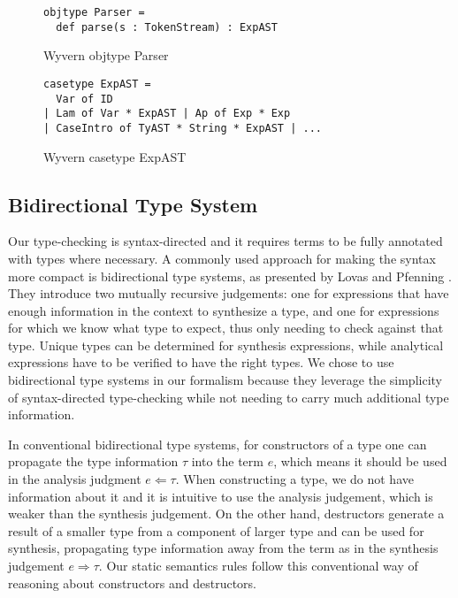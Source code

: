 

\begin{figure}
\begin{lstlisting}
objtype Parser = 
  def parse(s : TokenStream) : ExpAST
\end{lstlisting}
\caption{Wyvern objtype Parser}
\label{fig:typeParser}
\end{figure}

\begin{figure}
\begin{lstlisting}
casetype ExpAST = 
  Var of ID 
| Lam of Var * ExpAST | Ap of Exp * Exp 
| CaseIntro of TyAST * String * ExpAST | ...
\end{lstlisting}
\caption{Wyvern casetype ExpAST}
\label{fig:wyvExpAST}
\end{figure}

\subsection{Bidirectional Type System}
Our type-checking is syntax-directed and it requires terms to be fully annotated with types where necessary. A commonly used approach for making the syntax more compact is bidirectional type systems, as presented by Lovas and Pfenning \cite{Lovas08abidirectional}. They introduce two mutually recursive judgements: one for expressions that have enough information in the context to synthesize a type, and one for expressions for which we know what type to expect, thus only needing to check against that type. Unique types can be determined for synthesis expressions, while analytical expressions have to be verified to have the right types. We chose to use bidirectional type systems in our formalism because they leverage the simplicity of syntax-directed type-checking while not needing to carry much additional type information.

In conventional bidirectional type systems, for constructors of a type one can propagate the type information $\tau$
into the term $e$, which means it should be used in the analysis
judgment $e \Leftarrow \tau$. When constructing a type, we do not have information about it and it is intuitive to use the analysis judgement, which is weaker than the synthesis judgement. On the other hand, destructors generate a result of a smaller type from a component of larger type and can be used for synthesis, propagating type information away from the term as in the synthesis judgement $e \Rightarrow \tau$. Our static semantics rules follow this conventional way of reasoning about constructors and destructors.

